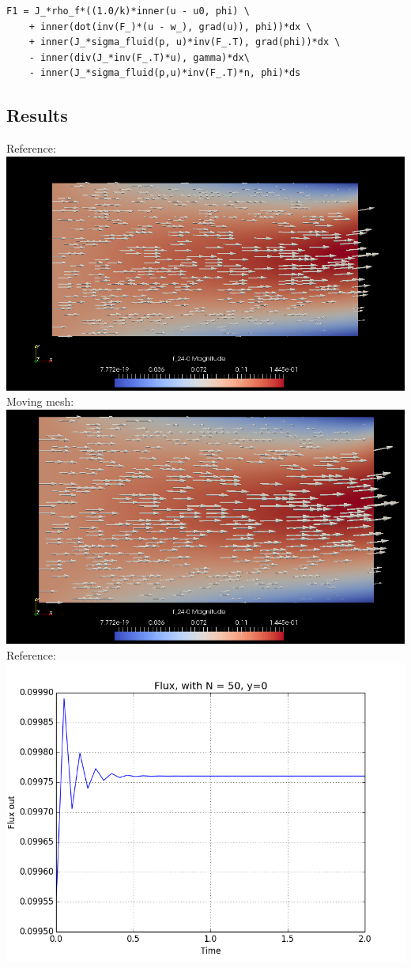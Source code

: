 \begin{lstlisting}[frame=single]
F1 = J_*rho_f*((1.0/k)*inner(u - u0, phi) \
    + inner(dot(inv(F_)*(u - w_), grad(u)), phi))*dx \
    + inner(J_*sigma_fluid(p, u)*inv(F_.T), grad(phi))*dx \
    - inner(div(J_*inv(F_.T)*u), gamma)*dx\
    - inner(J_*sigma_fluid(p,u)*inv(F_.T)*n, phi)*ds
\end{lstlisting}

\subsection*{Results}

Reference:\\
\includegraphics[scale=0.4]{ALE_vector_plot.png}
Moving mesh:\\
\includegraphics[scale=0.4]{E_vector_plot.png}
Reference:\\
\includegraphics[scale=0.4]{FluxPlot_ALE_N_50_dt_005.png}

